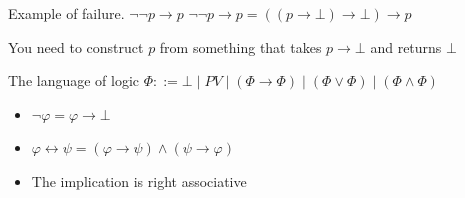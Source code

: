 \documentclass[sans]{beamer}
\begin{document}
\begin{frame}{Example of failure. $\lnot \lnot p \to p$}
  $\lnot \lnot p \to p = ((p \to \bot) \to \bot) \to p$

  \vspace{1cm}

  You need to construct $p$ from something that takes $p \to \bot$
  and returns $\bot$
\end{frame}

\begin{frame}{The language of logic}
  $\Phi ::= \bot \; | \; PV \; | \; (\Phi \to \Phi) \; |
   \; (\Phi \vee \Phi) \; | \; (\Phi \wedge \Phi) $

  \begin{itemize}
    \item $\lnot \varphi = \varphi \to \bot$
    \item $\varphi \leftrightarrow \psi = (\varphi \to \psi) \wedge (\psi \to \varphi)$
    \item The implication is right associative
  \end{itemize}
\end{frame}
\end{document}
